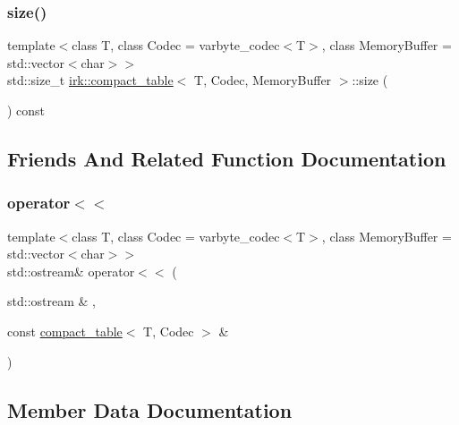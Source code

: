 \subsubsection{\texorpdfstring{size()}{size()}}
{\footnotesize\ttfamily template$<$class T, class Codec = varbyte\+\_\+codec$<$\+T$>$, class Memory\+Buffer = std\+::vector$<$char$>$$>$ \\
std\+::size\+\_\+t \mbox{\hyperlink{classirk_1_1compact__table}{irk\+::compact\+\_\+table}}$<$ T, Codec, Memory\+Buffer $>$\+::size (\begin{DoxyParamCaption}{ }\end{DoxyParamCaption}) const\hspace{0.3cm}{\ttfamily [inline]}}



\subsection{Friends And Related Function Documentation}
\mbox{\label{classirk_1_1compact__table_aabbde77b5cb5faeef5fe72eff9624aa5}} 
\subsubsection{\texorpdfstring{operator$<$$<$}{operator<<}}
{\footnotesize\ttfamily template$<$class T, class Codec = varbyte\+\_\+codec$<$\+T$>$, class Memory\+Buffer = std\+::vector$<$char$>$$>$ \\
std\+::ostream\& operator$<$$<$ (\begin{DoxyParamCaption}\item[{std\+::ostream \&}]{,  }\item[{const \mbox{\hyperlink{classirk_1_1compact__table}{compact\+\_\+table}}$<$ T, Codec $>$ \&}]{ }\end{DoxyParamCaption})\hspace{0.3cm}{\ttfamily [friend]}}



\subsection{Member Data Documentation}
\mbox{\label{classirk_1_1compact__table_aeac5fcd509fae2f16e455fc6a37eb1d3}} 
